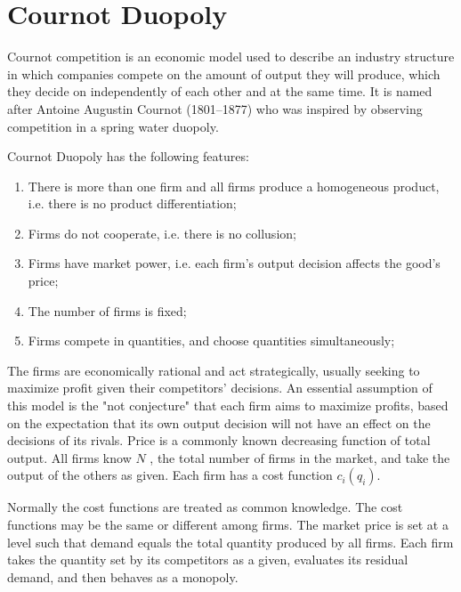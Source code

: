 \documentclass[a4paper,12pt]{article}
\begin{document}
\section{Cournot Duopoly}

Cournot competition is an economic model used to describe an industry structure in which companies compete on the amount of output they will produce, which they decide on independently of each other and at the same time. It is named after Antoine Augustin Cournot (1801–1877) who was inspired by observing competition in a spring water duopoly.

Cournot Duopoly has the following features:

\begin{enumerate}
\item There is more than one firm and all firms produce a homogeneous product, i.e. there is no product differentiation;
\item Firms do not cooperate, i.e. there is no collusion;
\item Firms have market power, i.e. each firm's output decision affects the good's price;
\item The number of firms is fixed;
\item Firms compete in quantities, and choose quantities simultaneously;
\end{enumerate}
The firms are economically rational and act strategically, usually seeking to maximize profit given their competitors' decisions.
An essential assumption of this model is the "not conjecture" that each firm aims to maximize profits, based on the expectation that its own output decision will not have an effect on the decisions of its rivals. Price is a commonly known decreasing function of total output. All firms know ${\displaystyle N}$ , the total number of firms in the market, and take the output of the others as given. Each firm has a cost function ${\displaystyle c_{i}(q_{i})}$. 

Normally the cost functions are treated as common knowledge. The cost functions may be the same or different among firms. The market price is set at a level such that demand equals the total quantity produced by all firms. Each firm takes the quantity set by its competitors as a given, evaluates its residual demand, and then behaves as a monopoly.
\end{document}
